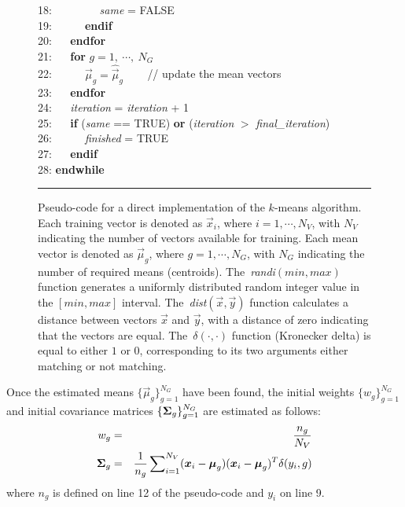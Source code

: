 \begin{figure}[!b]
\begin{small}
\begin{tabbing}
18: ~~ ~~ ~~ {\it same} = FALSE \\
19: ~~ ~~ {\bf endif} \\
20: ~~ {\bf endfor} \\
21: ~~ {\bf for} $g=1, ~\cdots, ~N_G$ \\
22: ~~ ~~ $\Vec{\mu}_g = \widehat{\Vec{\mu}}_g$ ~~~ {\small // update the mean vectors} \\
23: ~~ {\bf endfor} \\
24: ~~ {\it iteration} = {\it iteration} + 1 \\
25: ~~ {\bf if} ({\it same} == TRUE) {\bf or} ({\it iteration} $>$ {\it final\_iteration})  \\
26: ~~ ~~ {\it finished} = TRUE \\
27: ~~ {\bf endif} \\
28: {\bf endwhile}
\end{tabbing}
\end{small}
\vspace{-1ex}
\hrule
\caption
  {
  \small
  Pseudo-code for a direct implementation of the $k$-means algorithm.
  Each training vector is denoted as $\Vec{x}_i$, where $i = 1, \cdots, N_V$, with $N_V$ indicating the number of vectors available for training.
  Each mean vector is denoted as $\Vec{\mu}_g$, where $g = 1, \cdots, N_G$, with $N_G$ indicating the number of required means (centroids).
  The~{\it randi}$(min,max)$ function generates a uniformly distributed random integer value in the $[min,max]$ interval.
  The~{\it dist}$(\Vec{x},\Vec{y})$ function calculates a distance between vectors $\Vec{x}$ and $\Vec{y}$, with a distance of zero indicating that the vectors are equal.
  The~$\delta(\cdot,\cdot)$ function (Kronecker delta) is equal to either $1$ or $0$, corresponding to its two arguments either matching or not matching.
  }
\label{fig:kmeans_pseudocode}
\end{figure}

Once the estimated means $\{ \Vec{\mu}_g \}_{g=1}^{N_G}$ have been found,
the initial weights $\{ w_g \}_{g=1}^{N_G}$ and initial covariance matrices $\{ {{\boldsymbol{\Sigma}}_g} \}_{g=1}^{N_G}$
are estimated as follows:
%
\begin{eqnarray}
w_g & = & \frac{n_g}{N_V} \\
{\mbox {\boldmath $\Sigma$}_g} & = & \frac{1}{n_g} \sum\nolimits_{i=1}^{N_V} (\Vec{x}_i - \Vec{\mu}_g)(\Vec{x}_i - \Vec{\mu}_g)^T \delta(y_i, g)
\label{eqn:k-means_cov}
\end{eqnarray}
%
\noindent
where $n_g$ is defined on line 12 of the pseudo-code and $y_i$ on line 9.

